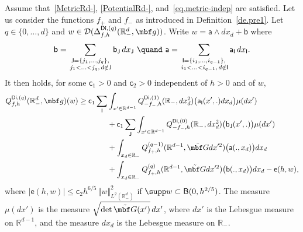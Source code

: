 \begin{lemma}\label{le.splitting}
Assume that~\ref{MetricRd-}, \ref{PotentialRd-},
and~\eqref{eq.metric-indep} are satisfied. Let us consider the
functions $f_+$ and $f_-$ as introduced in Definition~\ref{de.pre1}.
Let $q\in \{0,\ldots,d\}$ and $w\in \mathcal D(\Delta^{\mathsf{Di},(q)}_{f,h}(\mathbb R_-^d, \mbf g))$.
Write $w=\mathsf a \wedge dx_d+ \mathsf b$
where
\[
\mathsf b = \sum_{\substack{\mathsf J=\{j_1,\ldots,j_q\},\\ \, j_1<\ldots<j_q, \, d\notin \mathsf J} } \mathsf b_{\mathsf J}\, dx_{\mathsf J} \ \quand \ \mathsf a =\sum_{\substack{\mathsf I =\{i_1,\ldots,i_{q-1}\},\\ \, i_1<\ldots<i_{q-1},\,d\notin \mathsf I }} \mathsf a_{\mathsf I}\, dx_{\mathsf I}.
\]
It then holds, for some $\mathsf c_1>0$ and $\mathsf c_2>0$
independent of $h>0$ and of $w$,
\begin{align*}
\nonumber
Q^{\mathsf{Di},(q)}_{f,h}(\mathbb R_-^d, \mbf g)(w) \ge \mathsf c_1 \sum_{\mathsf I }& \int_{x'\in \mathbb R^{d-1} } Q^{\mathsf{Di},(1)}_{-f_-,h}(\mathbb R_-, dx_d^2)\bigl(\mathsf a_{\mathsf I}(x',.)dx_d \bigr) \mu(dx')\\
& + \mathsf c _1\sum_{\mathsf J } \int_{x'\in \mathbb R^{d-1} } Q^{\mathsf{Di},(0)}_{-f_-,h}(\mathbb R_-, dx_d^2)\bigl(\mathsf b_{\mathsf J}(x',.) \bigr) \mu(dx')\\
& + \int_{x_d\in \mathbb R_- } Q^{(q-1)}_{f_+,h}(\mathbb R^{d-1}, \tilde {\mbf G}dx'^2)\bigl(\mathsf a(.,x_d)\bigr) dx_d \\
& + \int_{x_d\in \mathbb R_- } Q^{(q)}_{f_+,h}(\mathbb
R^{d-1}, \tilde {\mbf G}dx'^2)\bigl(\mathsf b(.,x_d) \big) dx_d - \mathsf e(h,w),
\end{align*}
where $\vert \mathsf e(h,w)\vert \le \mathsf c_2h^{6/5}\, \Vert w
\Vert_{L^2(\mathbb R^d_-)}^2$ if $\supp w\subset \mathsf B(0,h^{2/5})$.
The measure $\mu(dx')$ is the measure $\sqrt{\det \tilde {\mbf G}(x')} \, dx'$, where $dx'$ is the Lebesgue measure on $\mathbb R^{d-1}$, and the measure $dx_d$ is the Lebesgue measure on $\mathbb R_-$.
\end{lemma}

